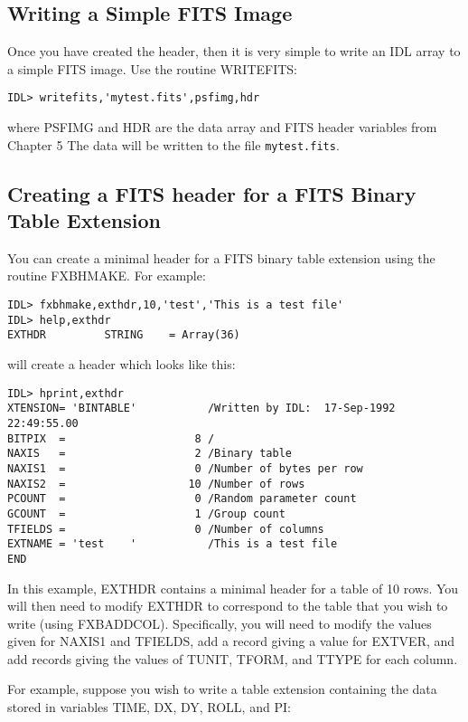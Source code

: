 \subsection{Writing a Simple FITS Image}
 
Once you have created the header, then it is very simple to write an IDL
array to a simple FITS image. Use the routine WRITEFITS:

\medskip\noindent
\begin{verbatim}
IDL> writefits,'mytest.fits',psfimg,hdr
\end{verbatim}
where PSFIMG and HDR are the data array and FITS header variables from Chapter 5
The data will be written to the file {\tt mytest.fits}.
 

\subsection{Creating a FITS header for a FITS Binary Table Extension}
 
You can create a minimal header for a FITS binary table extension using
the routine FXBHMAKE. For example:

\medskip\noindent
\begin{verbatim}
IDL> fxbhmake,exthdr,10,'test','This is a test file'
IDL> help,exthdr
EXTHDR         STRING    = Array(36)
\end{verbatim}
will create a header which looks like this:

\medskip\noindent
\begin{verbatim}
IDL> hprint,exthdr
XTENSION= 'BINTABLE'           /Written by IDL:  17-Sep-1992 22:49:55.00
BITPIX  =                    8 /
NAXIS   =                    2 /Binary table
NAXIS1  =                    0 /Number of bytes per row
NAXIS2  =                   10 /Number of rows
PCOUNT  =                    0 /Random parameter count
GCOUNT  =                    1 /Group count
TFIELDS =                    0 /Number of columns
EXTNAME = 'test    '           /This is a test file
END
\end{verbatim}
In this example, EXTHDR contains a minimal header for a table of 10 rows.
You will then need to modify EXTHDR to correspond to the table that
you wish to write (using FXBADDCOL). Specifically, you will need to
modify the values given for NAXIS1 and TFIELDS, add a record giving a
value for EXTVER, and add records giving the values of TUNIT, TFORM, and
TTYPE for each column.
 
For example, suppose you wish to write a table extension containing the
data stored in variables TIME, DX, DY, ROLL, and PI:

